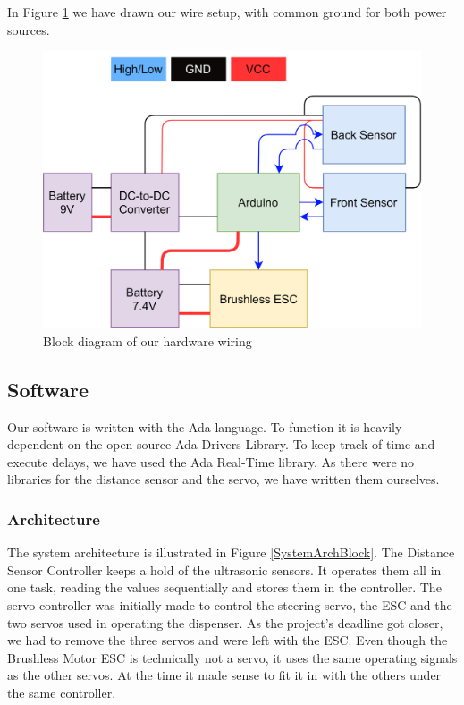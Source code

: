 \documentclass{article}
\begin{document}
In Figure \ref{Hardware} we have drawn our wire setup, with common ground for both power sources.
\begin{figure}[H]
  \centering
  \includegraphics[width=\linewidth]{hardware.png}
  \caption{Block diagram of our hardware wiring}
  \label{Hardware}
\end{figure}

\subsection{Software}
Our software is written with the Ada language. To function it is heavily dependent on the open source Ada Drivers Library. To keep track of time and execute delays, we have used the Ada Real-Time library. As there were no libraries for the distance sensor and the servo, we have written them ourselves.\\

\subsubsection{Architecture}
The system architecture is illustrated in Figure \ref{SystemArchBlock}. The Distance Sensor Controller keeps a hold of the ultrasonic sensors. It operates them all in one task, reading the values sequentially and stores them in the controller. The servo controller was initially made to control the steering servo, the ESC and the two servos used in operating the dispenser. As the project's deadline got closer, we had to remove the three servos and were left with the ESC. Even though the Brushless Motor ESC is technically not a servo, it uses the same operating signals as the other servos. At the time it made sense to fit it in with the others under the same controller.\\
\end{document}
